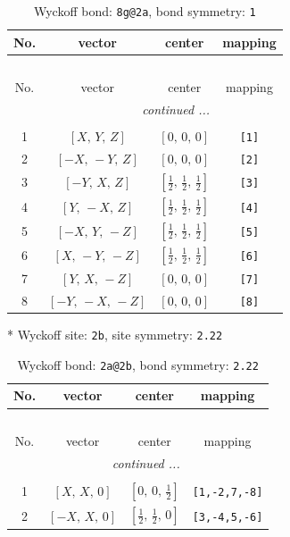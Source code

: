 \documentclass[fleqn,8pt]{jsarticle}
\begin{document}
\renewcommand{\arraystretch}{1.2}
\begin{longtable}{cccc}
\caption{Wyckoff bond: {\tt 8g@2a}, bond symmetry: {\tt 1}}
 \\
 \hline \hline
No. & vector & center & mapping \\ \hline \endfirsthead

\multicolumn{3}{l}{\tablename\ \thetable{}} \\
 \hline \hline
No. & vector & center & mapping \\ \hline \endhead

 \hline \hline
\multicolumn{3}{r}{\footnotesize\it continued ...} \\ \endfoot

 \hline \hline
\multicolumn{3}{r}{} \\ \endlastfoot

1 & $\left[ X,\, Y,\, Z \right]$ & $\left[ 0,\, 0,\, 0 \right]$ & {\tt [1]} \\ \hline
2 & $\left[ - X,\, - Y,\, Z \right]$ & $\left[ 0,\, 0,\, 0 \right]$ & {\tt [2]} \\ \hline
3 & $\left[ - Y,\, X,\, Z \right]$ & $\left[ \frac{1}{2},\, \frac{1}{2},\, \frac{1}{2} \right]$ & {\tt [3]} \\ \hline
4 & $\left[ Y,\, - X,\, Z \right]$ & $\left[ \frac{1}{2},\, \frac{1}{2},\, \frac{1}{2} \right]$ & {\tt [4]} \\ \hline
5 & $\left[ - X,\, Y,\, - Z \right]$ & $\left[ \frac{1}{2},\, \frac{1}{2},\, \frac{1}{2} \right]$ & {\tt [5]} \\ \hline
6 & $\left[ X,\, - Y,\, - Z \right]$ & $\left[ \frac{1}{2},\, \frac{1}{2},\, \frac{1}{2} \right]$ & {\tt [6]} \\ \hline
7 & $\left[ Y,\, X,\, - Z \right]$ & $\left[ 0,\, 0,\, 0 \right]$ & {\tt [7]} \\ \hline
8 & $\left[ - Y,\, - X,\, - Z \right]$ & $\left[ 0,\, 0,\, 0 \right]$ & {\tt [8]} \\
\end{longtable}
* Wyckoff site: {\tt 2b}, site symmetry: {\tt 2.22}
\renewcommand{\arraystretch}{1.2}
\begin{longtable}{cccc}
\caption{Wyckoff bond: {\tt 2a@2b}, bond symmetry: {\tt 2.22}}
 \\
 \hline \hline
No. & vector & center & mapping \\ \hline \endfirsthead

\multicolumn{3}{l}{\tablename\ \thetable{}} \\
 \hline \hline
No. & vector & center & mapping \\ \hline \endhead

 \hline \hline
\multicolumn{3}{r}{\footnotesize\it continued ...} \\ \endfoot

 \hline \hline
\multicolumn{3}{r}{} \\ \endlastfoot

1 & $\left[ X,\, X,\, 0 \right]$ & $\left[ 0,\, 0,\, \frac{1}{2} \right]$ & {\tt [1,-2,7,-8]} \\ \hline
2 & $\left[ - X,\, X,\, 0 \right]$ & $\left[ \frac{1}{2},\, \frac{1}{2},\, 0 \right]$ & {\tt [3,-4,5,-6]} \\
\end{longtable}
\end{document}

